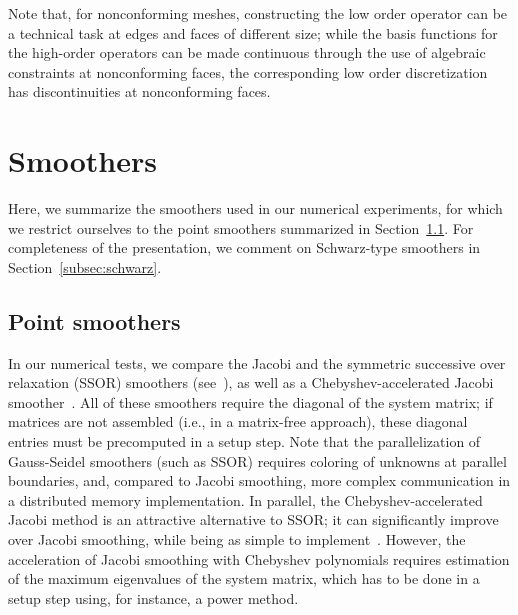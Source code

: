 \documentclass[smallcondensed,final]{svjour3}     %
\begin{document}
Note that, for nonconforming meshes, constructing the low order
operator can be a technical task at edges and faces of different size;
while the basis functions for the high-order operators can be made
continuous through the use of algebraic constraints at nonconforming
faces, the corresponding low order discretization has discontinuities
at nonconforming faces.








\section{Smoothers}
Here, we summarize the smoothers used in our numerical experiments, for
which we restrict ourselves to the point smoothers summarized in
Section~\ref{subsec:ptsmoothers}. For completeness of the
presentation, we comment on Schwarz-type smoothers in
Section~\ref{subsec:schwarz}.


\subsection{Point smoothers}\label{subsec:ptsmoothers}
In our numerical tests, we compare the Jacobi and the
symmetric successive over relaxation (SSOR) smoothers
(see~\cite{TrottenbergOosterleeSchuller01}), as well as a
Chebyshev-accelerated Jacobi smoother~\cite{....}. All of these
smoothers require the diagonal of the system matrix; if matrices are
not assembled (i.e., in a matrix-free approach), these diagonal
entries must be precomputed in a setup step.  Note that the
parallelization of Gauss-Seidel smoothers (such as SSOR) requires
coloring of unknowns at parallel boundaries, and, compared to Jacobi
smoothing, more complex communication in a distributed memory
implementation. In parallel, the Chebyshev-accelerated Jacobi method
is an attractive alternative to SSOR; it can significantly improve
over Jacobi smoothing, while being as simple to
implement~\cite{AdamsBrezinaHuEtAl03}. However, the acceleration of
Jacobi smoothing with Chebyshev polynomials requires estimation of the
maximum eigenvalues of the system matrix, which has to be done in a
setup step using, for instance, a power method.
\end{document}
